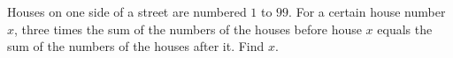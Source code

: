 Houses on one side of a street are numbered $1$ to $99$. For a certain house number $x$, three times the sum of the numbers of the houses before house $x$ equals the sum of the numbers of the houses after it. Find $x$.
